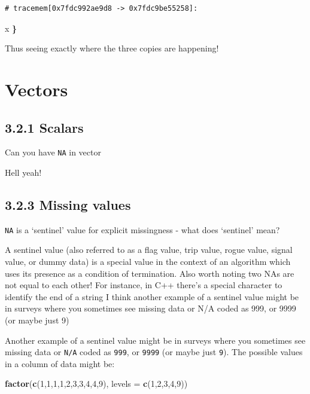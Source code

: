 \documentclass[]{book}
\newenvironment{Shaded}{\begin{snugshade}}{\end{snugshade}}
\newcommand{\DataTypeTok}[1]{\textcolor[rgb]{0.13,0.29,0.53}{#1}}
\newcommand{\DecValTok}[1]{\textcolor[rgb]{0.00,0.00,0.81}{#1}}
\newcommand{\ErrorTok}[1]{\textcolor[rgb]{0.64,0.00,0.00}{\textbf{#1}}}
\newcommand{\KeywordTok}[1]{\textcolor[rgb]{0.13,0.29,0.53}{\textbf{#1}}}
\newcommand{\NormalTok}[1]{#1}
\begin{document}
\begin{verbatim}
# tracemem[0x7fdc992ae9d8 -> 0x7fdc9be55258]: 
\end{verbatim}

\begin{Shaded}
\begin{Highlighting}[]
\NormalTok{  x}
\ErrorTok{\}}
\end{Highlighting}
\end{Shaded}

Thus seeing exactly where the three copies are happening!

\hypertarget{vectors}{%
\chapter{Vectors}\label{vectors}}

\hypertarget{scalars}{%
\section*{3.2.1 Scalars}\label{scalars}}

Can you have \texttt{NA} in vector

Hell yeah!

\hypertarget{missing-values}{%
\section*{3.2.3 Missing values}\label{missing-values}}

\texttt{NA} is a `sentinel' value for explicit missingness - what does `sentinel' mean?

A sentinel value (also referred to as a flag value, trip value, rogue value, signal value, or dummy data) is a special value in the context of an algorithm which uses its presence as a condition of termination. Also worth noting two NAs are not equal to each other! For instance, in C++ there's a special character to identify the end of a string I think another example of a sentinel value might be in surveys where you sometimes see missing data or N/A coded as 999, or 9999 (or maybe just 9)

Another example of a sentinel value might be in surveys where you sometimes see missing data or \texttt{N/A} coded as \texttt{999}, or \texttt{9999} (or maybe just \texttt{9}). The possible values in a column of data might be:

\begin{Shaded}
\begin{Highlighting}[]
\KeywordTok{factor}\NormalTok{(}\KeywordTok{c}\NormalTok{(}\DecValTok{1}\NormalTok{,}\DecValTok{1}\NormalTok{,}\DecValTok{1}\NormalTok{,}\DecValTok{1}\NormalTok{,}\DecValTok{2}\NormalTok{,}\DecValTok{3}\NormalTok{,}\DecValTok{3}\NormalTok{,}\DecValTok{4}\NormalTok{,}\DecValTok{4}\NormalTok{,}\DecValTok{9}\NormalTok{), }\DataTypeTok{levels =} \KeywordTok{c}\NormalTok{(}\DecValTok{1}\NormalTok{,}\DecValTok{2}\NormalTok{,}\DecValTok{3}\NormalTok{,}\DecValTok{4}\NormalTok{,}\DecValTok{9}\NormalTok{))}
\end{Highlighting}
\end{Shaded}
\end{document}
